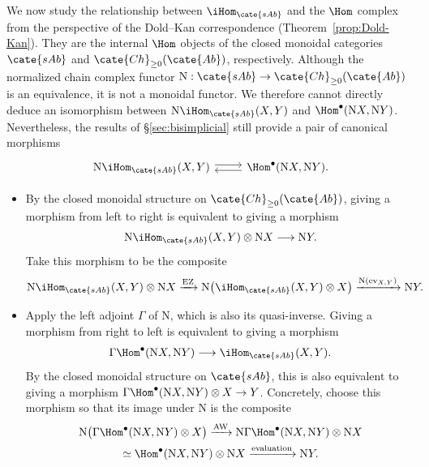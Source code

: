 We now study the relationship between $\iHom_{\cate{sAb}}$ and the $\Hom$
complex from the perspective of the Dold--Kan correspondence
(Theorem~\ref{prop:Dold-Kan}). They are the internal $\Hom$ objects of the
closed monoidal categories $\cate{sAb}$ and
$\cate{Ch}_{\geq0}(\cate{Ab})$, respectively. Although the normalized chain
complex functor
$\mathrm{N}:\cate{sAb}\to\cate{Ch}_{\geq0}(\cate{Ab})$ is an equivalence,
it is not a monoidal functor. We therefore cannot directly deduce an
isomorphism between $\mathrm{N}\iHom_{\cate{sAb}}(X,Y)$ and
$\Hom^\bullet(\mathrm{N}X,\mathrm{N}Y)$. Nevertheless, the results of
\S\ref{sec:bisimplicial} still provide a pair of canonical morphisms
\begin{equation}\label{eqn:Hom-N}
\begin{tikzcd}
	\mathrm{N}\iHom_{\cate{sAb}}(X,Y)\arrow[shift left,r]
	&\Hom^\bullet(\mathrm{N}X,\mathrm{N}Y).\arrow[shift left,l]
\end{tikzcd}
\end{equation}
\begin{itemize}
	\item By the closed monoidal structure on
	$\cate{Ch}_{\geq0}(\cate{Ab})$, giving a morphism from left to right is
	equivalent to giving a morphism
	\[
	\mathrm{N}\iHom_{\cate{sAb}}(X,Y)\otimes\mathrm{N}X
	\longrightarrow\mathrm{N}Y.
	\]
	Take this morphism to be the composite
	\[
	\mathrm{N}\iHom_{\cate{sAb}}(X,Y)\otimes\mathrm{N}X
	\xrightarrow{\mathrm{EZ}}
	\mathrm{N}\bigl(\iHom_{\cate{sAb}}(X,Y)\otimes X\bigr)
	\xrightarrow{\mathrm{N}(\mathrm{ev}_{X,Y})}\mathrm{N}Y.
	\]
	\item Apply the left adjoint $\Gamma$ of $\mathrm{N}$, which is also its
	quasi-inverse. Giving a morphism from right to left is equivalent to giving
	a morphism
	\[
	\Gamma\Hom^\bullet(\mathrm{N}X,\mathrm{N}Y)
	\longrightarrow\iHom_{\cate{sAb}}(X,Y).
	\]
	By the closed monoidal structure on $\cate{sAb}$, this is also equivalent
	to giving a morphism
	$\Gamma\Hom^\bullet(\mathrm{N}X,\mathrm{N}Y)\otimes X\to Y$.
	Concretely, choose this morphism so that its image under $\mathrm{N}$ is
	the composite
	\begin{multline*}
		\mathrm{N}\bigl(\Gamma\Hom^\bullet(\mathrm{N}X,\mathrm{N}Y)
		\otimes X\bigr)
		\xrightarrow{\mathrm{AW}}
		\mathrm{N}\Gamma\Hom^\bullet(\mathrm{N}X,\mathrm{N}Y)
		\otimes\mathrm{N}X\\
		\simeq\Hom^\bullet(\mathrm{N}X,\mathrm{N}Y)\otimes\mathrm{N}X
		\xrightarrow{\text{evaluation}}\mathrm{N}Y.
	\end{multline*}
\end{itemize}

